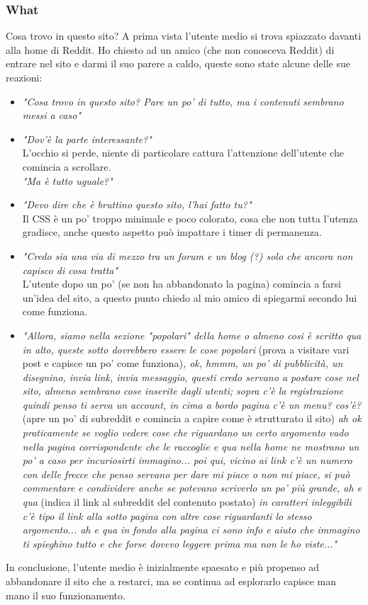 \documentclass[12pt]{article}
\begin{document}
\subsubsection{What} Cosa trovo in questo sito? A prima vista l'utente medio si trova spiazzato davanti alla home di Reddit. Ho chiesto ad un amico (che non conosceva Reddit) di entrare nel sito e darmi il suo parere a caldo, queste sono state alcune delle sue reazioni:
\begin{itemize}
	\item\textit{"Cosa trovo in questo sito? Pare un po' di tutto, ma i contenuti sembrano messi a caso"}
	\item \textit{"Dov'\`e la parte interessante?"} \\L'occhio si perde, niente di particolare cattura l'attenzione dell'utente che comincia a scrollare. \\\textit{"Ma \`e tutto uguale?"}
	\item \textit{"Devo dire che \`e bruttino questo sito, l'hai fatto tu?"} \\Il CSS \`e un po' troppo minimale e poco colorato, cosa che non tutta l'utenza gradisce, anche questo aspetto pu\`o impattare i timer di permanenza.
	\item \textit{"Credo sia una via di mezzo tra un forum e un blog (?) solo che ancora non capisco di cosa tratta"} \\L'utente dopo un po' (se non ha abbandonato la pagina) comincia a farsi un'idea del sito, a questo punto chiedo al mio amico di spiegarmi secondo lui come funziona.
	\item \textit{"Allora, siamo nella sezione "popolari" della home o almeno cosi \`e scritto qua in alto, queste sotto dovrebbero essere le cose popolari} (prova a visitare vari post e capisce un po' come funziona)\textit{, ok, hmmm, un po' di pubblicit\`a, un disegnino, invia link, invia messaggio, questi credo servano a postare cose nel sito, almeno sembrano cose inserite dagli utenti; sopra c'\`e la registrazione quindi penso ti serva un account, in cima a bordo pagina c'\`e un menu? cos'\`e?} (apre un po' di subreddit e comincia a capire come \`e strutturato il sito)\textit{ ah ok praticamente se voglio vedere cose che riguardano un certo argomento vado nella pagina corrispondente che le raccoglie e qua nella home ne mostrano un po' a caso per incuriosirti immagino... poi qui, vicino ai link c'\`e un numero con delle frecce che penso servano per dare mi piace o non mi piace, si pu\`o commentare e condividere anche se potevano scriverlo un po' pi\`u grande, ah e qua} (indica il link al subreddit del contenuto postato)\textit{ in caratteri inleggibili c'\`e tipo il link alla sotto pagina con altre cose riguardanti lo stesso argomento... ah e qua in fondo alla pagina ci sono info e aiuto che immagino ti spieghino tutto e che forse dovevo leggere prima ma non le ho viste..."}
\end{itemize}
In conclusione, l'utente medio \`e inizialmente spaesato e pi\`u propenso ad abbandonare il sito che a restarci, ma se continua ad esplorarlo capisce man mano il suo funzionamento.
\newpage
\end{document}
